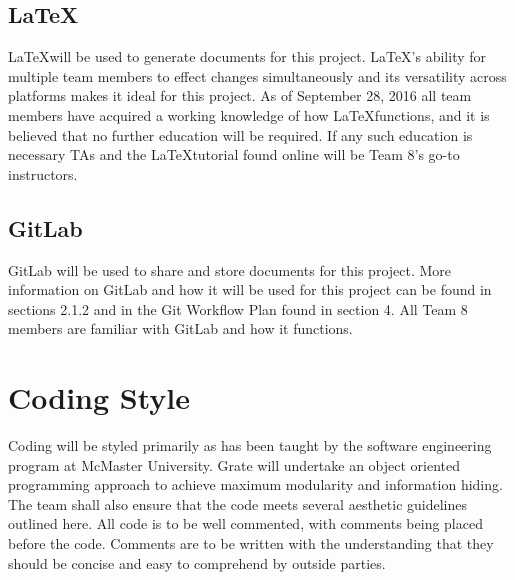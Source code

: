 \documentclass{article}
\begin{document}

\subsection{\LaTeX}

\LaTeX will be used to generate documents for this project. \LaTeX's ability for 
multiple team members to effect changes simultaneously and its versatility 
across platforms makes it ideal for this project. As of September 28, 2016 all 
team members have acquired a working knowledge of how \LaTeX functions, and it is 
believed that no further education will be required. If any such education is 
necessary TAs and the \LaTeX tutorial found online will be Team 8's go-to 
instructors. 

\subsection{GitLab}

GitLab will be used to share and store documents for this project. More 
information on GitLab and how it will be used for this project can be found in 
sections 2.1.2 and in the Git Workflow Plan found in section 4. All Team 8 
members are familiar with GitLab and how it functions. 

\section{Coding Style}

Coding will be styled primarily as has been taught by the software engineering 
program at McMaster University. Grate will undertake an object oriented 
programming approach to achieve maximum modularity and information hiding. The 
team shall also ensure that the code meets several aesthetic guidelines outlined 
here. All code is to be well commented, with comments being placed before the 
code. Comments are to be written with the understanding that they should be 
concise and easy to comprehend by outside parties. 
\end{document}
